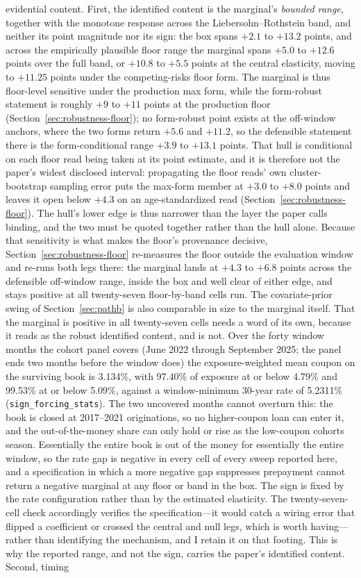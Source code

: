 \documentclass[12pt]{article}
\begin{document}
evidential content. First, the identified content is the marginal's \emph{bounded range}, together with the monotone response across the Liebersohn--Rothstein band, and neither its point magnitude nor its sign: the box spans $+2.1$ to $+13.2$ points, and across the empirically plausible floor range the marginal spans $+5.0$ to $+12.6$ points over the full band, or $+10.8$ to $+5.5$ points at the central elasticity, moving to $+11.25$ points under the competing-risks floor form. The marginal is thus floor-level sensitive under the production max form, while the form-robust statement is roughly $+9$ to $+11$ points at the production floor (Section~\ref{sec:robustness-floor}); no form-robust point exists at the off-window anchors, where the two forms return $+5.6$ and $+11.2$, so the defensible statement there is the form-conditional range $+3.9$ to $+13.1$ points. That hull is conditional on each floor read being taken at its point estimate, and it is therefore not the paper's widest disclosed interval: propagating the floor reads' own cluster-bootstrap sampling error puts the max-form member at $+3.0$ to $+8.0$ points and leaves it open below $+4.3$ on an age-standardized read (Section~\ref{sec:robustness-floor}). The hull's lower edge is thus narrower than the layer the paper calls binding, and the two must be quoted together rather than the hull alone. Because that sensitivity is what makes the floor's provenance decisive, Section~\ref{sec:robustness-floor} re-measures the floor outside the evaluation window and re-runs both legs there: the marginal lands at $+4.3$ to $+6.8$ points across the defensible off-window range, inside the box and well clear of either edge, and stays positive at all twenty-seven floor-by-band cells run. The covariate-prior swing of Section~\ref{sec:pathb} is also comparable in size to the marginal itself. That the marginal is positive in all twenty-seven cells needs a word of its own, because it reads as the robust identified content, and is not. Over the forty window months the cohort panel covers (June 2022 through September 2025; the panel ends two months before the window does) the exposure-weighted mean coupon on the surviving book is 3.134\%, with 97.40\% of exposure at or below 4.79\% and 99.53\% at or below 5.09\%, against a window-minimum 30-year rate of 5.2311\% (\texttt{sign\_forcing\_stats}). The two uncovered months cannot overturn this: the book is closed at 2017--2021 originations, so no higher-coupon loan can enter it, and the out-of-the-money share can only hold or rise as the low-coupon cohorts season. Essentially the entire book is out of the money for essentially the entire window, so the rate gap is negative in every cell of every sweep reported here, and a specification in which a more negative gap suppresses prepayment cannot return a negative marginal at any floor or band in the box. The sign is fixed by the rate configuration rather than by the estimated elasticity. The twenty-seven-cell check accordingly verifies the specification---it would catch a wiring error that flipped a coefficient or crossed the central and null legs, which is worth having---rather than identifying the mechanism, and I retain it on that footing. This is why the reported range, and not the sign, carries the paper's identified content. Second, timing 
\end{document}
